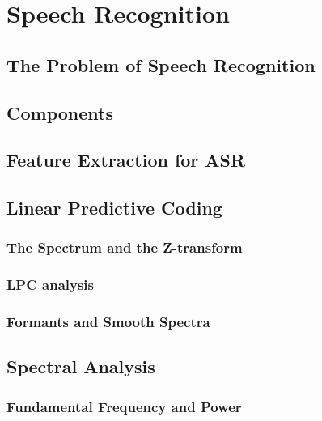 \chapter{Speech Recognition}
\label{chap:Speech Recognition}

\section{The Problem of Speech Recognition}
\label{sec:The Problem of Speech Recognition}

\section{Components}
\label{sec:Components}

\section{Feature Extraction for ASR}
\label{sec:Feature Extraction for ASR}


\section{Linear Predictive Coding}
\label{sec:Linear Predictive Coding}

\subsection{The Spectrum and the Z-transform}
\label{sub:The Spectrum and the Z-transform}

\subsection{LPC analysis}
\label{sub:LPC analysis}

\subsection{Formants and Smooth Spectra}
\label{sub:Formants and Smooth Spectra}

\section{Spectral Analysis}
\label{sec:Spectral Analysis}

\subsection{Fundamental Frequency and Power}
\label{sub:Fundamental Frequency and Power}


